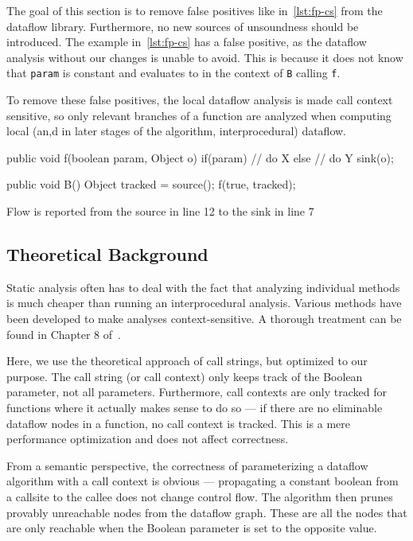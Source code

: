 The goal of this section is to remove false positives like in~\autoref{lst:fp-cs}
from the dataflow library.
Furthermore, no new sources of unsoundness should be introduced.
The example in~\autoref{lst:fp-cs} has a false positive,
as the dataflow analysis without our changes is unable to avoid.
This is because it does not know that \texttt{param} is constant and evaluates 
to 
in the context of \texttt{B} calling \texttt{f}.

To remove these false positives, the local dataflow 
analysis is made call context sensitive, so only relevant branches of a function
are analyzed when computing local 
(an,d in later stages of the algorithm, interprocedural) dataflow.

\begin{listing}
    \begin{javacode}
public void f(boolean param, Object o) {
    if(param) {
        // do X
    }
    else {
        // do Y
        sink(o);
    }
}

public void B() {
    Object tracked = source();
    f(true, tracked);
}
        \end{javacode}
    \caption{Flow is reported from the source in line 12 to the sink in line 7}
    \label{lst:fp-cs}
\end{listing}


\subsection{Theoretical Background}
Static analysis often has to deal with the fact that analyzing individual methods 
is much cheaper than running an interprocedural analysis.
Various methods have been developed to make analyses context-sensitive.
A thorough treatment can be found in Chapter 8 of~\cite{spa}.

Here, we use the theoretical approach of call strings, but optimized to our purpose.
The call string (or call context) only keeps track of the Boolean parameter, not
all parameters.
Furthermore, call contexts are only tracked for functions where it actually makes sense 
to do so --- if there are no eliminable dataflow nodes in a function,
no call context is tracked.
This is a mere performance optimization and does not affect correctness.

From a semantic perspective, the correctness of parameterizing a
dataflow algorithm with a call context is obvious ---
propagating a constant boolean from a callsite to the callee does not change 
control flow.
The algorithm then prunes provably unreachable nodes from the dataflow graph.
These are all the nodes that are only reachable when the Boolean parameter is set
to the opposite value.


